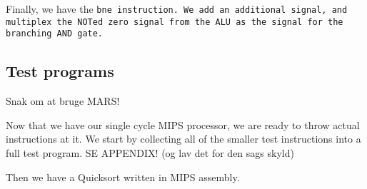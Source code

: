 Finally, we have the \tt{bne} instruction. We add an additional signal, and
multiplex the \tt{NOT}ed \tt{zero} signal from the ALU as the signal for the
branching \tt{AND} gate.

\subsection{Test programs}
Snak om at bruge MARS!

Now that we have our single cycle MIPS processor, we are ready to throw actual
instructions at it. We start by collecting all of the smaller test instructions
into a full test program. SE APPENDIX! (og lav det for den sags skyld)

Then we have a Quicksort written in MIPS assembly.
